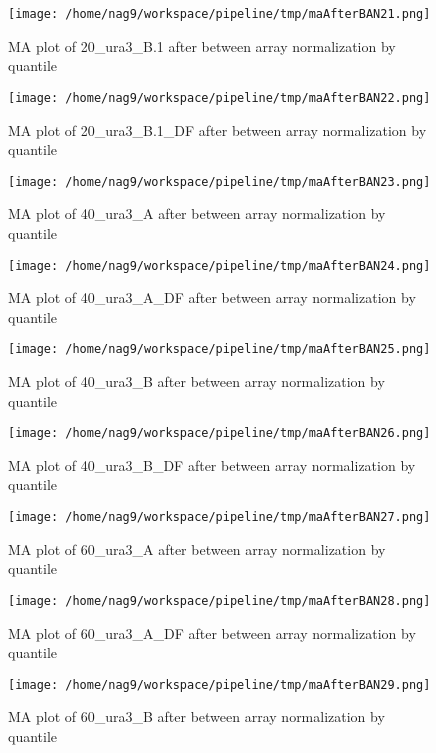 \documentclass[titlepage]{article}
\begin{document}
\begin{figure}[htb!]
\centering
\texttt{[image: /home/nag9/workspace/pipeline/tmp/maAfterBAN21.png]}
\caption{MA plot of 20\_ura3\_B.1 after between array normalization by quantile}
\end{figure}\pagebreak
\begin{figure}[htb!]
\centering
\texttt{[image: /home/nag9/workspace/pipeline/tmp/maAfterBAN22.png]}
\caption{MA plot of 20\_ura3\_B.1\_DF after between array normalization by quantile}
\end{figure}\pagebreak
\begin{figure}[htb!]
\centering
\texttt{[image: /home/nag9/workspace/pipeline/tmp/maAfterBAN23.png]}
\caption{MA plot of 40\_ura3\_A after between array normalization by quantile}
\end{figure}\pagebreak
\begin{figure}[htb!]
\centering
\texttt{[image: /home/nag9/workspace/pipeline/tmp/maAfterBAN24.png]}
\caption{MA plot of 40\_ura3\_A\_DF after between array normalization by quantile}
\end{figure}\pagebreak
\begin{figure}[htb!]
\centering
\texttt{[image: /home/nag9/workspace/pipeline/tmp/maAfterBAN25.png]}
\caption{MA plot of 40\_ura3\_B after between array normalization by quantile}
\end{figure}\pagebreak
\begin{figure}[htb!]
\centering
\texttt{[image: /home/nag9/workspace/pipeline/tmp/maAfterBAN26.png]}
\caption{MA plot of 40\_ura3\_B\_DF after between array normalization by quantile}
\end{figure}\pagebreak
\begin{figure}[htb!]
\centering
\texttt{[image: /home/nag9/workspace/pipeline/tmp/maAfterBAN27.png]}
\caption{MA plot of 60\_ura3\_A after between array normalization by quantile}
\end{figure}\pagebreak
\begin{figure}[htb!]
\centering
\texttt{[image: /home/nag9/workspace/pipeline/tmp/maAfterBAN28.png]}
\caption{MA plot of 60\_ura3\_A\_DF after between array normalization by quantile}
\end{figure}\pagebreak
\begin{figure}[htb!]
\centering
\texttt{[image: /home/nag9/workspace/pipeline/tmp/maAfterBAN29.png]}
\caption{MA plot of 60\_ura3\_B after between array normalization by quantile}
\end{figure}\pagebreak
\end{document}
